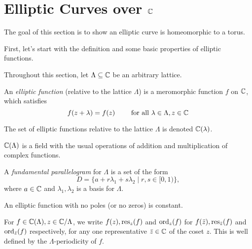 \section{Elliptic Curves over \texorpdfstring{$\mathbb{C}$}{C}}
\label{sec:over-C}

The goal of this section is to show an elliptic curve is
homeomorphic to a torus.

First, let's start with the definition and some basic properties of elliptic functions.

Throughout this section, let $\Lambda \subseteq \mathbb{C}$ be an arbitrary lattice.

\begin{definition}
	An \emph{elliptic function} (relative to the lattice $\Lambda$) is a meromorphic function
	$f$ on $\mathbb{C}$, which satisfies
	\begin{equation*}
		f(z + \lambda) = f(z)\qquad\textrm{ for all } \lambda \in \Lambda, z \in \mathbb{C}
	\end{equation*}
\end{definition}

\begin{notation}
	The set of elliptic functions relative to the lattice $\Lambda$ is denoted
	$\mathbb{C}(\lambda)$.
\end{notation}

\begin{remark}
	$\mathbb{C}(\Lambda)$ is a field with the usual operations of 
	addition and multiplication of complex functions.
\end{remark}

\begin{definition}
	A \emph{fundamental parallelogram} for $\Lambda$ is a set of the form
	\begin{equation*}
		D = \{a + r \lambda_1 + s \lambda_2 \mid r, s \in [0, 1)\},
	\end{equation*}
	where $a \in \mathbb{C}$ and $\lambda_1, \lambda_2$ is a basis for $\Lambda$.
\end{definition}

\begin{proposition}
	\label{prop:no-poles}
	An elliptic function with no poles (or no zeros) is constant.
\end{proposition}

\begin{notation}
	For $f \in \mathbb{C}(\Lambda), z \in \mathbb{C}/\Lambda$, we write $f(z), \operatorname{res}_z(f)$ and $\operatorname{ord}_z(f)$ for
	$f(\bar{z}), \operatorname{res}_{\bar{z}}(f)$ and $\operatorname{ord}_{\bar{z}}(f)$ respectively,
	for any one representative
	$\bar{z} \in \mathbb{C}$ of the coset $z$. This is well defined by the
	$\Lambda$-periodicity of $f$.
\end{notation}

